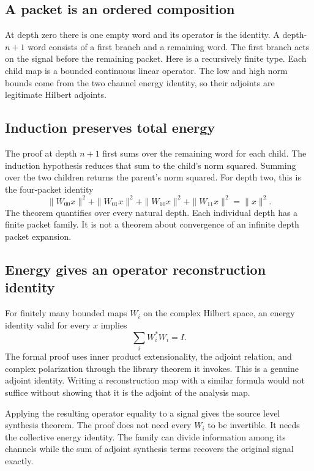 \subsection{A packet is an ordered composition}
At depth zero there is one empty word and its operator is the identity. A depth-$n+1$ word consists of a first branch and a remaining word. The first branch acts on the signal before the remaining packet.
Here  is a recursively finite type. Each child map is a bounded continuous linear operator. The low and high norm bounds come from the two channel energy identity, so their adjoints are legitimate Hilbert adjoints.

\subsection{Induction preserves total energy}
The proof at depth $n+1$ first sums over the remaining word for each child. The induction hypothesis reduces that sum to the child's norm squared. Summing over the two children returns the parent's norm squared.
For depth two, this is the four-packet identity
\[
\|W_{00}x\|^2+\|W_{01}x\|^2+\|W_{10}x\|^2+\|W_{11}x\|^2=\|x\|^2.
\]
The theorem quantifies over every natural depth. Each individual depth has a finite packet family. It is not a theorem about convergence of an infinite depth packet expansion.

\subsection{Energy gives an operator reconstruction identity}
For finitely many bounded maps $W_i$ on the complex Hilbert space, an energy identity valid for every $x$ implies
\[
\sum_i W_i^*W_i=I.
\]
The formal proof uses inner product extensionality, the adjoint relation, and complex polarization through the library theorem it invokes.
This is a genuine adjoint identity. Writing a reconstruction map with a similar formula would not suffice without showing that it is the adjoint of the analysis map.

Applying the resulting operator equality to a signal gives the source level synthesis theorem.
The proof does not need every $W_i$ to be invertible. It needs the collective energy identity. The family can divide information among its channels while the sum of adjoint synthesis terms recovers the original signal exactly.

